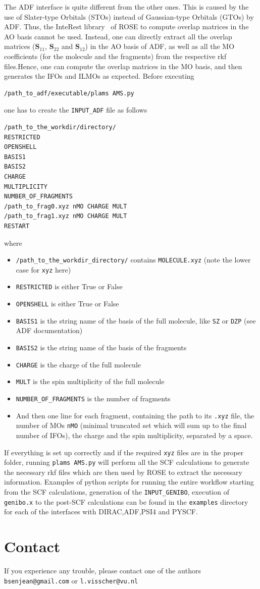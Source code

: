 \documentclass[preprint]{revtex4-1}
\begin{document}
\begin{itemize}
The ADF interface is quite different from the other ones.
This is caused by the use of Slater-type Orbitals (STOs)
instead of Gaussian-type Orbitals (GTOs) by ADF.
Thus, the InteRest library~\cite{interest} of ROSE to compute overlap matrices in the AO basis
cannot be used.
Instead, one can directly extract all the overlap matrices ($\mathbf{S}_{11}$,
$\mathbf{S}_{22}$ and $\mathbf{S}_{12}$) in the AO basis of ADF,
as well as all the MO coefficients (for the molecule and the fragments) from the respective rkf files.Hence, one can compute the overlap matrices in the MO basis,
and then generates the IFOs and ILMOs as expected.
Before executing
\begin{lstlisting}[language=bash]
/path_to_adf/executable/plams AMS.py
\end{lstlisting}
one has to create the \verb|INPUT_ADF| file as follows
\begin{lstlisting}[language=bash]
/path_to_the_workdir/directory/
RESTRICTED
OPENSHELL
BASIS1
BASIS2
CHARGE
MULTIPLICITY
NUMBER_OF_FRAGMENTS
/path_to_frag0.xyz nMO CHARGE MULT
/path_to_frag1.xyz nMO CHARGE MULT
RESTART
\end{lstlisting}
\end{itemize}
where
\begin{itemize}
\item \verb|/path_to_the_workdir_directory/| contains \verb|MOLECULE.xyz| (note the lower 
case for \verb|xyz| here)
\item \verb|RESTRICTED| is either True or False
\item \verb|OPENSHELL| is either True or False
\item \verb|BASIS1| is the string name of the basis of the full molecule, like \verb|SZ| or 
\verb|DZP| (see ADF documentation)
\item \verb|BASIS2| is the string name of the basis of the fragments
\item \verb|CHARGE| is the charge of the full molecule
\item \verb|MULT| is the spin multiplicity of the full molecule
\item \verb|NUMBER_OF_FRAGMENTS| is the number of fragments
\item And then one line for each fragment, containing the path to its \verb|.xyz| file, 
the number of MOs \verb|nMO| (minimal truncated set which will sum up to the final number of IFOs),
the charge and the spin multiplicity, separated by a space.
\end{itemize}

If everything is set up correctly and if the required \verb|xyz| files are in the proper folder,
running \verb|plams AMS.py| will perform all the SCF calculations to generate the necessary rkf files which are then used by ROSE to extract the necessary information.
Examples of python scripts for running the entire workflow starting from the SCF calculations, generation of the  \verb|INPUT_GENIBO|, execution of  \verb|genibo.x| to the post-SCF calculations can be found in the \verb|examples| directory for each of the interfaces with DIRAC,ADF,PSI4 and PYSCF.

\section{Contact}

If you experience any trouble, please contact one of the authors \verb|bsenjean@gmail.com| or \verb|l.visscher@vu.nl|



\end{document}
